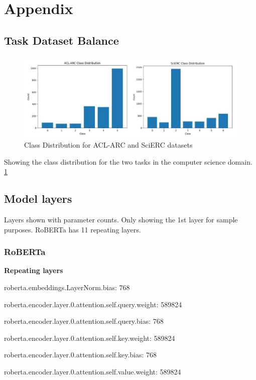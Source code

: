 \documentclass[10pt,twocolumn,letterpaper]{article}
\begin{document}
\section{Appendix}
\subsection{Task Dataset Balance}
\begin{figure}[h] %
    \centering %
    \includegraphics[width=\textwidth]{DatasetBalance.png} %
    \caption{Class Distribution for ACL-ARC and SciERC datasets} %
    \label{fig:example} %
\end{figure}
Showing the class distribution for the two tasks in the computer science domain. \ref{fig:example}
\FloatBarrier

\subsection{Model layers}
Layers shown with parameter counts. Only showing the 1st layer for sample purposes. RoBERTa has 11 repeating layers.
\subsubsection{RoBERTa }
\label{sec:robertamodel} 
\textbf{Repeating layers}

roberta.embeddings.LayerNorm.bias: 768

roberta.encoder.layer.0.attention.self.query.weight: 589824

roberta.encoder.layer.0.attention.self.query.bias: 768

roberta.encoder.layer.0.attention.self.key.weight: 589824

roberta.encoder.layer.0.attention.self.key.bias: 768

roberta.encoder.layer.0.attention.self.value.weight: 589824
\end{document}
